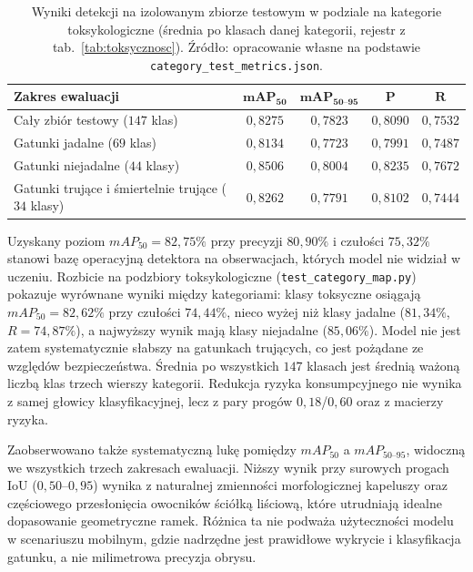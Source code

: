 \begin{table}[htbp]
 \centering
 \caption{Wyniki detekcji na izolowanym zbiorze testowym w podziale na kategorie toksykologiczne (średnia po klasach danej kategorii, rejestr z tab.~\ref{tab:toksycznosc}). Źródło: opracowanie własne na podstawie \texttt{category\_test\_metrics.json}.}
 \label{tab:wyniki_kategorie}
 \begin{tabular}{|l|c|c|c|c|}
 \hline
 \textbf{Zakres ewaluacji} & $\boldsymbol{mAP_{50}}$ & $\boldsymbol{mAP_{50\text{--}95}}$ & $\boldsymbol{P}$ & $\boldsymbol{R}$ \\
 \hline \hline
 Cały zbiór testowy ($147$ klas) & $0{,}8275$ & $0{,}7823$ & $0{,}8090$ & $0{,}7532$ \\
 \hline
 Gatunki jadalne ($69$ klas) & $0{,}8134$ & $0{,}7723$ & $0{,}7991$ & $0{,}7487$ \\
 \hline
 Gatunki niejadalne ($44$ klasy) & $0{,}8506$ & $0{,}8004$ & $0{,}8235$ & $0{,}7672$ \\
 \hline
 Gatunki trujące i śmiertelnie trujące ($34$ klasy) & $0{,}8262$ & $0{,}7791$ & $0{,}8102$ & $0{,}7444$ \\
 \hline
 \end{tabular}
\end{table}

Uzyskany poziom $mAP_{50}=82{,}75\%$ przy precyzji $80{,}90\%$ i czułości $75{,}32\%$ stanowi bazę operacyjną detektora na obserwacjach, których model nie widział w uczeniu. Rozbicie na podzbiory toksykologiczne (\texttt{test\_category\_map.py}) pokazuje wyrównane wyniki między kategoriami: klasy toksyczne osiągają $mAP_{50}=82{,}62\%$ przy czułości $74{,}44\%$, nieco wyżej niż klasy jadalne ($81{,}34\%$, $R=74{,}87\%$), a najwyższy wynik mają klasy niejadalne ($85{,}06\%$). Model nie jest zatem systematycznie słabszy na gatunkach trujących, co jest pożądane ze względów bezpieczeństwa. Średnia po wszystkich $147$ klasach jest średnią ważoną liczbą klas trzech wierszy kategorii. Redukcja ryzyka konsumpcyjnego nie wynika z samej głowicy klasyfikacyjnej, lecz z pary progów $0{,}18$/$0{,}60$ oraz z macierzy ryzyka.

Zaobserwowano także systematyczną lukę pomiędzy $mAP_{50}$ a $mAP_{50\text{--}95}$, widoczną we wszystkich trzech zakresach ewaluacji. Niższy wynik przy surowych progach IoU ($0{,}50$--$0{,}95$) wynika z naturalnej zmienności morfologicznej kapeluszy oraz częściowego przesłonięcia owocników ściółką liściową, które utrudniają idealne dopasowanie geometryczne ramek. Różnica ta nie podważa użyteczności modelu w scenariuszu mobilnym, gdzie nadrzędne jest prawidłowe wykrycie i klasyfikacja gatunku, a nie milimetrowa precyzja obrysu.

